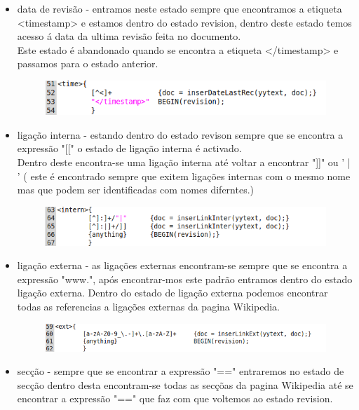 \documentclass[a4paper,11pt,openright,openbib]{report}
\begin{document}
\begin{itemize}
	\item data de revisão - entramos neste estado sempre que encontramos a etiqueta <timestamp> e estamos dentro do estado revision, dentro deste estado temos acesso á data da ultima revisão feita no documento.\\
	Este estado é abandonado quando se encontra a etiqueta </timestamp> e passamos para o estado anterior.\\
	\begin{figure}[!htb]
		\centering
		\includegraphics[scale=0.5]{imagens/time.png}
	\end{figure}
	\item ligação interna - estando dentro do estado revison sempre que se encontra a expressão "[[" o estado de ligação interna é activado.\\ Dentro deste encontra-se uma ligação interna até voltar a encontrar "]]" ou ' | ' ( este é encontrado sempre que exitem ligações internas com o mesmo nome mas que podem ser identificadas com nomes diferntes.)\\
	\begin{figure}[!htb]
		\centering
		\includegraphics[scale=0.5]{imagens/intern.png}
	\end{figure}
	\item ligação externa - as ligações externas encontram-se sempre que se encontra a expressão "www.", após encontrar-mos este padrão entramos dentro do estado ligação externa. Dentro do estado de ligação externa podemos encontrar todas as referencias a ligações externas da pagina Wikipedia.\\
	\begin{figure}[!htb]
		\centering
		\includegraphics[scale=0.5]{imagens/ext.png}
	\end{figure} 
	\item secção - sempre que se encontrar a expressão "==" entraremos no estado de secção dentro desta encontram-se todas as secçõas da pagina Wikipedia até se encontrar a expressão "==" que faz com que voltemos ao estado revision.\\

\end{itemize}
\end{document}
